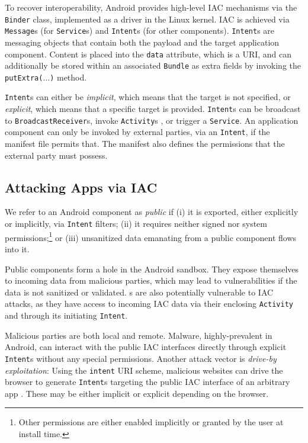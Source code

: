 To recover interoperability, Android provides high-level IAC mechanisms via the {\tt Binder} class, implemented as a driver in the Linux kernel. IAC is achieved via {\tt Message}s (for {\tt Service}s) and {\tt Intent}s (for other components). {\tt Intent}s are messaging objects that contain both the payload and the target application component. Content is placed into the {\tt data} attribute, which is a URI, and can additionally be stored within an associated {\tt Bundle} as extra fields by invoking the 
{\tt putExtra($\ldots$)} method. 

{\tt Intent}s can either be \emph{implicit}, which means that the target is not specified, or \emph{explicit}, which means that a specific target is provided. 
%
{\tt Intent}s can be broadcast
to {\tt BroadcastReceiver}s, invoke {\tt Activity}s , or trigger
a {\tt Service}. An application component can only be invoked by external parties, via an {\tt Intent}, if the manifest file permits that. The manifest also defines the permissions that the external party must possess.

\subsection{Attacking Apps via IAC}

We refer to an Android component as \emph{public} if (i) it is exported, either explicitly or implicitly, via {\tt Intent} filters; (ii) it requires neither signed nor system permissions;\footnote{
	Other permissions are either enabled implicitly or granted by the user at install time.
} or (iii) unsanitized data emanating from a public component flows into it.

Public components form a hole in the Android sandbox. They expose themselves to incoming data from malicious parties, which may lead to vulnerabilities if the data is not sanitized or validated. {\Frag}s are also potentially vulnerable to IAC attacks, as they have access to incoming IAC data via their enclosing {\tt Activity} and through its initiating {\tt Intent}.

Malicious parties are both local and remote. Malware, highly-prevalent in Android, can interact with the public IAC interfaces directly through explicit {\tt Intent}s without any special permissions. Another attack vector is \emph{drive-by exploitation}: Using the {\tt intent} URI scheme, malicious websites can drive the browser to generate {\tt Intent}s targeting the public IAC interface of an arbitrary app \cite{PHAB:ACSAC10,E:driveby}. These may be either implicit or explicit depending on the browser.

